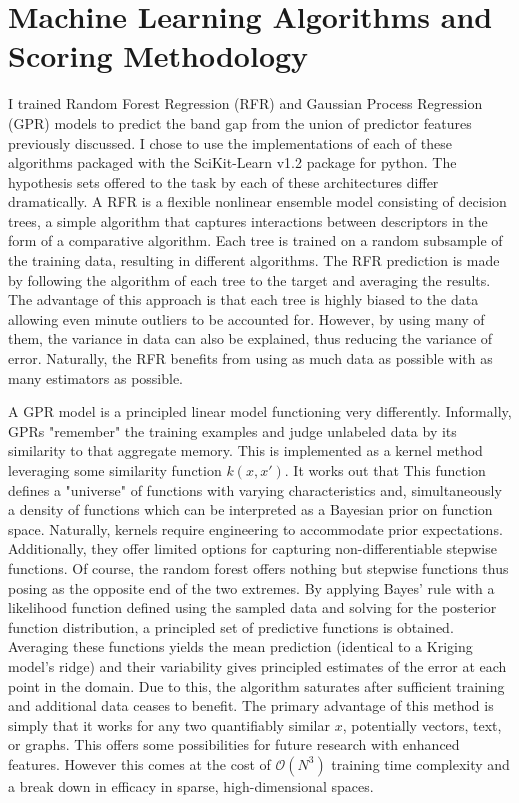 \section{Machine Learning Algorithms and Scoring Methodology}
\label{sec:orgf7d8230}
I trained Random Forest Regression (RFR) and Gaussian Process Regression (GPR) models to predict the band gap from the union of predictor features previously discussed.
I chose to use the implementations of each of these algorithms packaged with the SciKit-Learn v1.2 package for python.
\autocite{pedregosa-2011-scikit-learn} 
The hypothesis sets offered to the task by each of these architectures differ dramatically.
A RFR is a flexible nonlinear ensemble model consisting of decision trees, a simple algorithm that captures interactions between descriptors in the form of a comparative algorithm.
Each tree is trained on a random subsample of the training data, resulting in different algorithms.
The RFR prediction is made by following the algorithm of each tree to the target and averaging the results.
The advantage of this approach is that each tree is highly biased to the data allowing even minute outliers to be accounted for.
However, by using many of them, the variance in data can also be explained, thus reducing the variance of error.
Naturally, the RFR benefits from using as much data as possible with as many estimators as possible.

A GPR model is a principled linear model functioning very differently.
Informally, GPRs "remember" the training examples and judge unlabeled data by its similarity to that aggregate memory.
This is implemented as a kernel method leveraging some similarity function \(k(x, x')\).
It works out that This function defines a "universe" of functions with varying characteristics and, simultaneously a density of functions which can be interpreted as a Bayesian prior on function space.
Naturally, kernels require engineering to accommodate prior expectations. Additionally, they offer limited options for capturing non-differentiable stepwise functions.
Of course, the random forest offers nothing but stepwise functions thus posing as the opposite end of the two extremes.
By applying Bayes' rule with a likelihood function defined using the sampled data and solving for the posterior function distribution, a principled set of predictive functions is obtained.
Averaging these functions yields the mean prediction (identical to a Kriging model's ridge) and their variability gives principled estimates of the error at each point in the domain.
Due to this, the algorithm saturates after sufficient training and additional data ceases to benefit.
The primary advantage of this method is simply that it works for any two quantifiably similar \(x\), potentially vectors, text, or graphs.
This offers some possibilities for future research with enhanced features.
However this comes at the cost of \(\mathcal{O}(N^3)\) training time complexity and a break down in efficacy in sparse, high-dimensional spaces.

